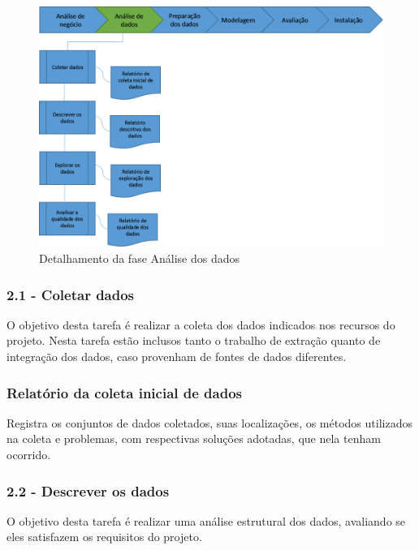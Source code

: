 \begin{figure}[H]
	\includegraphics[scale=0.8]{img/CRISP-DM-Analise-dos-dados.png}
	\caption{Detalhamento da fase Análise dos dados}
	\label{img:CRISP-DM-Analise-dos-dados}
\end{figure}


\subsubsection*{\textbf{2.1 - Coletar dados}}

O objetivo desta tarefa é realizar a coleta dos dados indicados nos recursos do projeto. Nesta tarefa estão inclusos tanto o trabalho de extração quanto de integração dos dados, caso provenham de fontes de dados diferentes.

\subsubsection*{Relatório da coleta inicial de dados}

Registra os conjuntos de dados coletados, suas localizações, os métodos utilizados na coleta e problemas, com respectivas soluções adotadas, que nela tenham ocorrido.

\subsubsection*{\textbf{2.2 - Descrever os dados}}

O objetivo desta tarefa é realizar uma análise estrutural dos dados, avaliando se eles satisfazem os requisitos do projeto.

